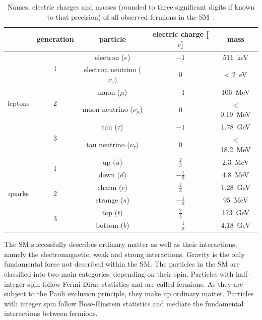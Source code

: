 \begin{table}
	\centering
	\setlength\heavyrulewidth{0.2ex}
	\small
	\caption{Names, electric charges and masses (rounded to three significant digits if known to that precision) of all observed fermions in the SM~\cite{pdg2020}.}
	\begin{tabular} {c c c c c}
		
		\toprule
				& generation & particle & electric charge [$e$] & mass \\ 
		\midrule 
				\multirow{6}{*}{leptons}& \multirow{2}{*}{1} & electron ($e$)& $-1$ & \SI{511}{\keV}\\
				& & electron neutrino ($\nu_e$) & 0 & < \SI{2}{\eV} \\
				& \multirow{2}{*}{2} & muon ($\mu$)& $-1$ & \SI{106}{\MeV}\\
				& & muon neutrino ($\nu_\mu$) & 0 & < \SI{0.19}{\MeV} \\
				& \multirow{2}{*}{3} & tau ($\tau$)& $-1$ & \SI{1.78}{\GeV}\\
				& & tau neutrino ($\nu_\tau$) & 0 & < \SI{18.2}{\MeV} \\
		\midrule 
				\multirow{6}{*}{quarks}& \multirow{2}{*}{1} & up ($u$)& $\frac{2}{3}$ & \SI{2.3}{\MeV}\\
				& & down ($d$) & $-\frac{1}{3}$ & \SI{4.8}{\MeV} \\
				& \multirow{2}{*}{2} & charm ($c$)& $\frac{2}{3}$ & \SI{1.28}{\GeV}\\
				& & strange ($s$) & $-\frac{1}{3}$ &\SI{95}{\MeV} \\
				& \multirow{2}{*}{3} & top ($t$)& $\frac{2}{3}$ & \SI{173}{\GeV}\\
				& & bottom ($b$) & $-\frac{1}{3}$ & \SI{4.18}{\GeV} \\
		\bottomrule
	\end{tabular}\vspace{3mm}
	\label{tab:particles_fermions}   
\end{table}

The SM successfully describes  ordinary matter as well as their interactions, namely the electromagnetic, weak and strong interactions. Gravity is the only fundamental force not described within the SM. The particles in the SM are classified into two main categories, depending on their spin. Particles with half-integer spin follow Fermi-Dirac statistics and are called fermions. As they are subject to the Pauli exclusion principle, they make up ordinary matter. Particles with integer spin follow Bose-Einstein statistics and mediate the fundamental interactions between fermions. 

